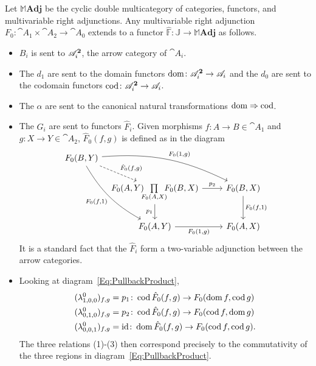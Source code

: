 \begin{example}\label{Ex:PullbackProduct}
Let $\mathbb{M}\mathbf{Adj}$ be the cyclic double multicategory of categories, functors, and multivariable right adjunctions. Any multivariable right adjunction $F_0\colon \cat{A}_1\times \cat{A}_2\to \cat{A}_0$ extends to a functor $\widehat{\mathbb{F}}\colon\mathbb{J}\to\mathbb{M}\mathbf{Adj}$ as follows.
\begin{itemize}
	\item $B_i$ is sent to $\mathscr{A}_i^{\mathbf{2}}$, the arrow category of $\cat{A}_i$.
	\item The $d_1$ are sent to the domain functors $\operatorname{dom}\colon\mathscr{A}_i^{\mathbf{2}}\to\mathscr{A}_i$ and the $d_0$ are sent to the codomain functors $\operatorname{cod}\colon\mathscr{A}_i^{\mathbf{2}}\to\mathscr{A}_i$.
	\item The $\alpha$ are sent to the canonical natural transformations $\operatorname{dom}\Rightarrow\operatorname{cod}$.
	\item The $G_i$ are sent to functors $\hat{F}_i$. Given morphisms $f\colon A\to B\in\cat{A}_1$ and $g\colon X\to Y\in\cat{A}_2$, $\hat{F}_0(f,g)$ is defined as in the diagram
	\begin{equation}\label{Eq:PullbackProduct}
	\begin{tikzcd}[bend angle=15]
		F_0(B,Y) \arrow[bend left]{rrd}{F_0(1,g)}
			\arrow[bend right]{rdd}[swap]{F_0(f,1)}
			\arrow[dashed]{dr}{\hat{F}_0(f,g)}
		&[-4ex]& \\
		& F_0(A,Y)\!\!\underset{F_0(A,X)}{\prod}\!\!F_0(B,X)
			\rar{p_2}
			\dar[swap]{p_1}
		& F_0(B,X) \dar{F_0(f,1)} \\
		& F_0(A,Y) \rar[swap]{F_0(1,g)} & F_0(A,X)
	\end{tikzcd}
	\end{equation}
	It is a standard fact that the $\hat{F}_i$ form a two-variable adjunction between the arrow categories. 
	\item Looking at diagram~\eqref{Eq:PullbackProduct}, 
	\begin{align*}
		(\lambda^0_{1,0,0})_{f,g}&=p_1\colon \operatorname{cod}\hat{F}_0(f,g)\to F_0(\operatorname{dom} f,\operatorname{cod} g)\\
		(\lambda^0_{0,1,0})_{f,g}&=p_2\colon \operatorname{cod}\hat{F}_0(f,g)\to F_0(\operatorname{cod} f,\operatorname{dom} g)\\
		(\lambda^0_{0,0,1})_{f,g}&=\operatorname{id}\colon \operatorname{dom}\hat{F}_0(f,g)\to F_0(\operatorname{cod} f,\operatorname{cod} g).
	\end{align*}
	The three relations (1)-(3) then correspond precisely to the commutativity of the three regions in diagram~\eqref{Eq:PullbackProduct}.
\end{itemize}
\end{example}

